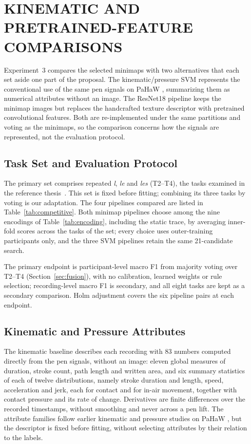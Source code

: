 \section{\uppercase{Kinematic and Pretrained-Feature Comparisons}}
\label{sec:competitive}

\noindent
Experiment~3 compares the selected minimaps with two alternatives that each set aside one part of the proposal. The kinematic/pressure SVM represents the conventional use of the same pen signals on PaHaW \cite{Drotar2016}, summarizing them as numerical attributes without an image. The ResNet18 pipeline keeps the minimap images but replaces the handcrafted texture descriptor with pretrained convolutional features. Both are re-implemented under the same partitions and voting as the minimaps, so the comparison concerns how the signals are represented, not the evaluation protocol.

\subsection{Task Set and Evaluation Protocol}
\noindent
The primary set comprises repeated \textit{l}, \textit{le} and \textit{les} (T2--T4), the tasks examined in the reference thesis~\cite{Casademunt2023}. This set is fixed before fitting; combining its three tasks by voting is our adaptation. The four pipelines compared are listed in Table~\ref{tab:competitive}. Both minimap pipelines choose among the nine encodings of Table~\ref{tab:encoding}, including the static trace, by averaging inner-fold scores across the tasks of the set; every choice uses outer-training participants only, and the three SVM pipelines retain the same 21-candidate search.

The primary endpoint is participant-level macro F1 from majority voting over T2--T4 (Section~\ref{sec:fusion}), with no calibration, learned weights or rule selection; recording-level macro F1 is secondary, and all eight tasks are kept as a secondary comparison. Holm adjustment covers the six pipeline pairs at each endpoint.

\subsection{Kinematic and Pressure Attributes}
\noindent
The kinematic baseline describes each recording with 83 numbers computed directly from the pen signals, without an image: eleven global measures of duration, stroke count, path length and written area, and six summary statistics of each of twelve distributions, namely stroke duration and length, speed, acceleration and jerk, each for contact and for in-air movement, together with contact pressure and its rate of change. Derivatives are finite differences over the recorded timestamps, without smoothing and never across a pen lift. The attribute families follow earlier kinematic and pressure studies on PaHaW \cite{Drotar2016}, but the descriptor is fixed before fitting, without selecting attributes by their relation to the labels.

